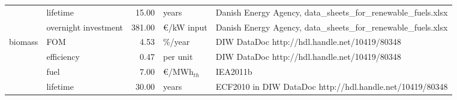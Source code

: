 \begin{longtable}{p{4cm}p{4cm}rp{3cm}p{10cm}}
                      & lifetime &        15.00 &                         years &                                                                                                                                                                                                                                                                       Danish Energy Agency, data\_sheets\_for\_renewable\_fuels.xlsx \\
                      & overnight investment &       381.00 &                \euro/kW input &                                                                                                                                                                                                                                                                       Danish Energy Agency, data\_sheets\_for\_renewable\_fuels.xlsx \\
biomass & FOM &         4.53 &                       \%/year &                                                                                                                                                                                                                                                                                        DIW DataDoc http://hdl.handle.net/10419/80348 \\
                      & efficiency &         0.47 &                      per unit &                                                                                                                                                                                                                                                                                        DIW DataDoc http://hdl.handle.net/10419/80348 \\
                      & fuel &         7.00 &              \euro/MWh$_{th}$ &                                                                                                                                                                                                                                                                                                                             IEA2011b \\
                      & lifetime &        30.00 &                         years &                                                                                                                                                                                                                                                                             ECF2010 in DIW DataDoc http://hdl.handle.net/10419/80348 \\

\end{longtable}
